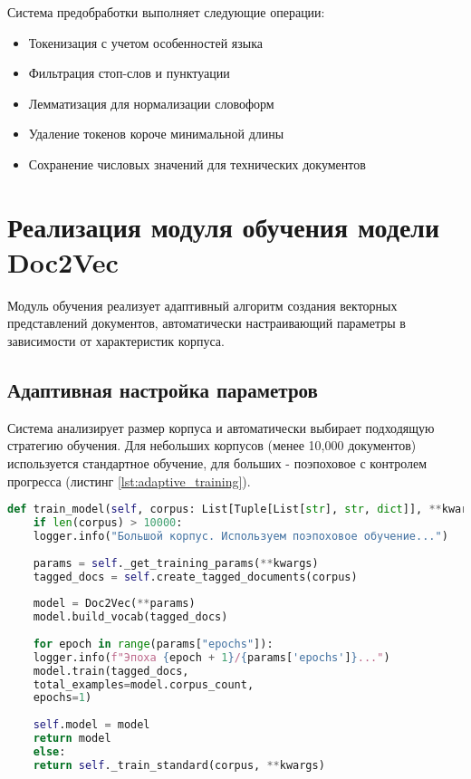 Система предобработки выполняет следующие операции:
\begin{itemize}
	\item Токенизация с учетом особенностей языка
	\item Фильтрация стоп-слов и пунктуации
	\item Лемматизация для нормализации словоформ
	\item Удаление токенов короче минимальной длины
	\item Сохранение числовых значений для технических документов
\end{itemize}

\section{Реализация модуля обучения модели Doc2Vec}

Модуль обучения реализует адаптивный алгоритм создания векторных представлений документов, автоматически настраивающий параметры в зависимости от характеристик корпуса.

\subsection{Адаптивная настройка параметров}

Система анализирует размер корпуса и автоматически выбирает подходящую стратегию обучения. Для небольших корпусов (менее 10,000 документов) используется стандартное обучение, для больших - поэпоховое с контролем прогресса (листинг \ref{lst:adaptive_training}).

\begin{lstlisting}[language=Python,caption={Адаптивное обучение модели},label=lst:adaptive_training]
	def train_model(self, corpus: List[Tuple[List[str], str, dict]], **kwargs) -> Optional[Doc2Vec]:
	if len(corpus) > 10000:
	logger.info("Большой корпус. Используем поэпоховое обучение...")
	
	params = self._get_training_params(**kwargs)
	tagged_docs = self.create_tagged_documents(corpus)
	
	model = Doc2Vec(**params)
	model.build_vocab(tagged_docs)
	
	for epoch in range(params["epochs"]):
	logger.info(f"Эпоха {epoch + 1}/{params['epochs']}...")
	model.train(tagged_docs, 
	total_examples=model.corpus_count, 
	epochs=1)
	
	self.model = model
	return model
	else:
	return self._train_standard(corpus, **kwargs)
\end{lstlisting}

